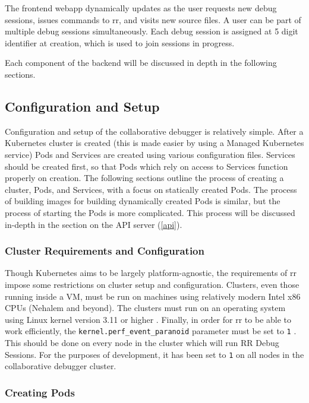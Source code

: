 \documentclass[12pt]{article}
\begin{document}
The frontend webapp dynamically updates as the user requests new debug
sessions, issues commands to rr, and visits new source files.  A user
can be part of multiple debug sessions simultaneously.  Each debug
session is assigned at 5 digit identifier at creation, which is used
to join sessions in progress.
\par

Each component of the backend will be discussed in depth in the
following sections.

\subsection{Configuration and Setup}

Configuration and setup of the collaborative debugger is relatively
simple.  After a Kubernetes cluster is created (this is made easier by
using a Managed Kubernetes service) Pods and Services are created
using various configuration files.  Services should be created first,
so that Pods which rely on access to Services function properly on
creation.  The following sections outline the process of creating a
cluster, Pods, and Services, with a focus on statically created Pods.
The process of building images for building dynamically created Pods
is similar, but the process of starting the Pods is more complicated.
This process will be discussed in-depth in the section on the API
server (\ref{api}).

\subsubsection{Cluster Requirements and Configuration}

Though Kubernetes aims to be largely platform-agnostic, the
requirements of rr impose some restrictions on cluster setup and
configuration.  Clusters, even those running inside a VM, must be run
on machines using relatively modern Intel x86 CPUs (Nehalem and
beyond).  The clusters must run on an operating system using Linux
kernel version 3.11 or higher \cite{rr-repo}.  Finally, in order for
rr to be able to work efficiently, the
\lstinline{kernel.perf_event_paranoid} parameter must be set to
\lstinline{1} \cite{rr-repo}.  This should be done on every node in
the cluster which will run RR Debug Sessions.  For the purposes of
development, it has been set to \lstinline{1} on all nodes in the
collaborative debugger cluster.

\subsubsection{Creating Pods}
\end{document}
